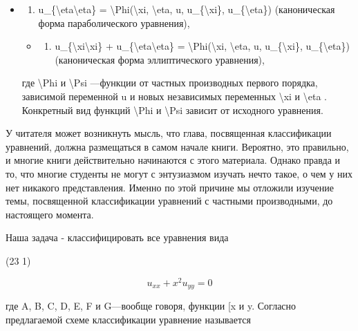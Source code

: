 \documentclass[
]{article}
\providecommand{\tightlist}{%
  \setlength{\itemsep}{0pt}\setlength{\parskip}{0pt}}
\begin{document}
\begin{itemize}
\item
  \begin{enumerate}
  \def\labelenumi{\arabic{enumi}.}
  \setcounter{enumi}{1}
  \tightlist
  \item
    u\_\{\textbackslash eta\textbackslash eta\} =
    \textbackslash Phi(\textbackslash xi, \textbackslash eta, u,
    u\_\{\textbackslash xi\}, u\_\{\textbackslash eta\}) (каноническая
    форма параболического уравнения),
  \end{enumerate}

  \begin{itemize}
  \tightlist
  \item
    \begin{enumerate}
    \def\labelenumi{\arabic{enumi}.}
    \setcounter{enumi}{2}
    \tightlist
    \item
      u\_\{\textbackslash xi\textbackslash xi\} +
      u\_\{\textbackslash eta\textbackslash eta\} =
      \textbackslash Phi(\textbackslash xi, \textbackslash eta, u,
      u\_\{\textbackslash xi\}, u\_\{\textbackslash eta\}) (каноническая
      форма эллиптического уравнения),
    \end{enumerate}
  \end{itemize}

  где \textbackslash Phi и \textbackslash Psi ---функции от частных
  производных первого порядка, зависимой переменной u и новых
  независимых переменных \textbackslash xi и \textbackslash eta .
  Конкретный вид функций \textbackslash Phi и \textbackslash Psi зависит
  от исходного уравнения.
\end{itemize}

У читателя может возникнуть мысль, что глава, посвященная классификации
уравнений, должна размещаться в самом начале книги. Вероятно, это
правильно, и многие книги действительно начинаются с этого материала.
Однако правда и то, что многие студенты не могут с энтузиазмом изучать
нечто такое, о чем у них нет никакого представления. Именно по этой
причине мы отложили изучение темы, посвященной классификации уравнений с
частными производными, до настоящего момента.

Наша задача - классифицировать все уравнения вида

(23 1)

\[
u_{xx} + x^2 u_{yy} = 0
\]

где A, B, C, D, E, F и G---вообще говоря, функции {[}x и y. Согласно
предлагаемой схеме классификации уравнение называется
\end{document}
